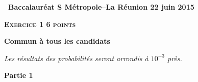 \documentclass[10pt]{article}
\begin{document}
\setlength\parindent{0mm}
\renewcommand \footrulewidth{.2pt}
\pagestyle{fancy}
\thispagestyle{empty}
\begin{center} {\Large{\textbf{\decofourleft~Baccalauréat S Métropole--La Réunion 22 juin 2015~\decofourright
}}} 

\end{center}

\vspace{0,5cm}

\textbf{\textsc{Exercice 1 \hfill 6 points}}

\textbf{Commun à tous les candidats} 

\medskip

\emph{Les résultats des probabilités seront arrondis à $10^{-3}$ près.}

\bigskip

\textbf{Partie 1}

\medskip
\end{document}
